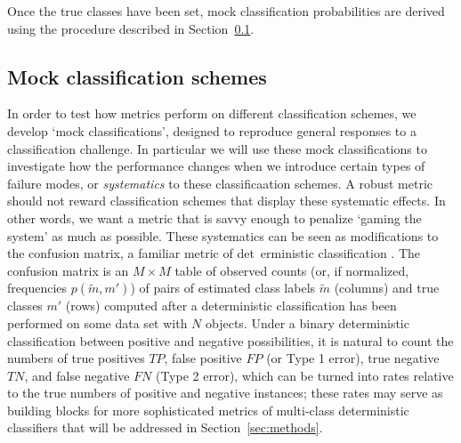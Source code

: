 Once the true classes have been set, mock classification probabilities are derived using the procedure described in Section~\ref{sec:mockdata}.

\subsection{Mock classification schemes}
\label{sec:mockdata}
In order to test how metrics perform on different classification schemes, we develop `mock classifications', designed to reproduce general responses to a classification challenge. In particular we will use these mock classifications to investigate how the performance changes when we introduce certain types of failure modes, or \textit{systematics} to these classificaation schemes. A robust metric should not reward classification schemes that display these systematic effects. In other words, we want a metric that is savvy enough to penalize `gaming the system' as much as possible.
These systematics can be seen as modifications to the confusion matrix, a familiar metric of det\
erministic classification \citep{2012PASP..124.1175B}. The confusion matrix is an $M \times M$ table of observed counts (or, if normalized, frequencies $p(\tilde{m}, m')$) of pairs of estimated class labels $\tilde{m}$ (columns) and true classes $m'$ (rows) computed after a deterministic classification has been performed on some data set with $N$ objects.
Under a binary deterministic classification between positive and negative possibilities, it is natural to count the numbers of true positives $TP$, false positive $FP$ (or Type 1 error), true negative $TN$, and false negative $FN$ (Type 2 error), which can be turned into rates relative to the true numbers of positive and negative instances; these rates may serve as building blocks for more sophisticated metrics of multi-class deterministic classifiers that will be addressed in Section~\ref{sec:methods}.

